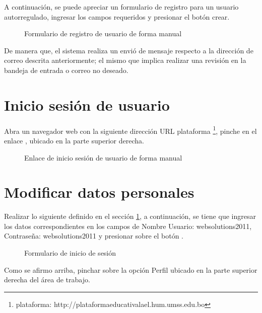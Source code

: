 A continuación, se puede apreciar un formulario de registro para un usuario
autorregulado, ingresar los campos requeridos y presionar el botón crear.
 
\begin{figure}[H]
\centering
		\caption{Formulario de registro de usuario de forma manual}
\end{figure}

De manera que, el sistema realiza un envió de mensaje respecto a la dirección
de correo descrita anteriormente; el mismo que implica realizar una revisión
en la bandeja de entrada o correo no deseado.

\begin{figure}[!ht]
\centering
		\caption{}
\end{figure}

\section{Inicio sesión de usuario} \label{sec:login}

Abra un navegador web con la siguiente dirección URL plataforma \footnote{plataforma: http://plataformaeducativalael.hum.umss.edu.bo}, pinche en el enlace ,
ubicado en la parte superior derecha.

\begin{figure}[!ht]
\centering
		\caption{Enlace de inicio sesión de usuario de forma manual}
\end{figure}

\section{Modificar datos personales}

Realizar lo siguiente definido en el sección \ref{sec:login}, a continuación, se tiene
que ingresar los datos correspondientes en los campos de Nombre Usuario:
websolutions2011, Contraseña: websolutions2011 y presionar sobre el botón
.

\begin{figure}[H]
\centering
		\caption{Formulario de inicio de sesión}
\end{figure}

Como se afirmo arriba, pinchar sobre la opción Perfil ubicado en la parte
superior derecha del área de trabajo.

